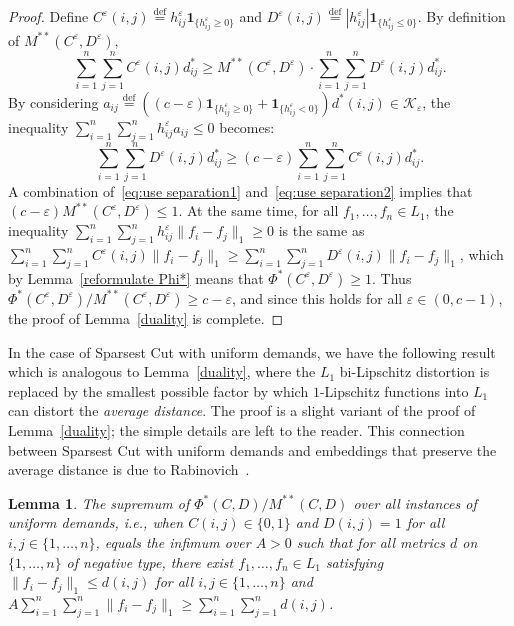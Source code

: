 \documentclass{icm2010}
\newtheorem{lemma}[theorem]{Lemma}
\theoremstyle{definition}
\newcommand{\eqdef}{\stackrel{\mathrm{def}}{=}}
\newcommand{\1}{\mathbf{1}}
\renewcommand{\le}{\leqslant}
\renewcommand{\ge}{\geqslant}
\newcommand{\e}{\varepsilon}
\begin{document}
\begin{proof}
Define $C^\e(i,j)\eqdef h_{ij}^\e\1_{\{h_{ij}^\e\ge 0\}}$ and
$D^\e(i,j)\eqdef|h_{ij}^\e|\1_{\{h_{ij}^\e\le 0\}}$. By definition of
$M^{**}(C^\e,D^\e)$,
\begin{equation}\label{eq:use separation1}
\sum_{i=1}^n\sum_{j=1}^n C^\e(i,j)d^*_{ij}\ge
M^{**}(C^\e,D^\e)\cdot\sum_{i=1}^n\sum_{j=1}^n D^\e(i,j)d^*_{ij}.
\end{equation}
By considering $a_{ij}\eqdef\left((c-\e)\1_{\{h_{ij}^\e\ge
0\}}+\1_{\{h_{ij}^\e< 0\}}\right)d^*(i,j)\in \mathscr K_\e$, the
inequality $\sum_{i=1}^n\sum_{j=1}^n h_{ij}^\e a_{ij} \le 0$
becomes:
\begin{equation}\label{eq:use separation2}
\sum_{i=1}^n\sum_{j=1}^n D^\e(i,j)d^*_{ij}\ge
(c-\e)\sum_{i=1}^n\sum_{j=1}^n C^\e(i,j)d^*_{ij}.
\end{equation}
A combination of~\eqref{eq:use separation1} and~\eqref{eq:use
separation2} implies that $(c-\e)M^{**}(C^\e,D^\e)\le 1$. At the
same time, for all $f_1,\ldots,f_n\in L_1$, the inequality
$\sum_{i=1}^n\sum_{j=1}^n h_{ij}^\e\|f_i-f_j\|_1\ge 0$ is the same
as $\sum_{i=1}^n\sum_{j=1}^n C^\e(i,j)\|f_i-f_j\|_1\ge
\sum_{i=1}^n\sum_{j=1}^n D^\e(i,j)\|f_i-f_j\|_1$, which by
Lemma~\ref{reformulate Phi*} means that $\Phi^*(C^\e,D^\e)\ge 1$.
Thus $\Phi^*(C^\e,D^\e)/M^{**}(C^\e,D^\e)\ge c-\e$, and since this
holds for all $\e\in (0,c-1)$, the proof of Lemma~\ref{duality} is
complete.
\end{proof}

In the case of Sparsest Cut with uniform demands, we have the
following result which is analogous to Lemma~\ref{duality}, where the
$L_1$ bi-Lipschitz distortion is replaced by the smallest possible
factor by which $1$-Lipschitz functions into $L_1$ can distort the
{\em average distance}. The proof is a slight variant of the proof
of Lemma~\ref{duality}; the simple details are left to the reader.
This connection between Sparsest Cut with uniform demands and
embeddings that preserve the average distance is due to
Rabinovich~\cite{Rab08}.

\begin{lemma}\label{lem:average distance}
The supremum of $\Phi^*(C,D)/M^{**}(C,D)$ over all instances of
uniform demands, i.e., when $C(i,j)\in \{0,1\}$ and $D(i,j)=1$ for
all $i,j\in \{1,\ldots,n\}$, equals the infimum over $A>0$ such that
for all metrics $d$ on $\{1,\ldots,n\}$ of negative type, there
exist $f_1,\ldots,f_n\in L_1$ satisfying $\|f_i-f_j\|_1\le d(i,j)$
for all $i,j\in \{1,\ldots,n\}$ and
$A\sum_{i=1}^n\sum_{j=1}^n\|f_i-f_j\|_1\ge
\sum_{i=1}^n\sum_{j=1}^nd(i,j)$.
\end{lemma}
\end{document}
